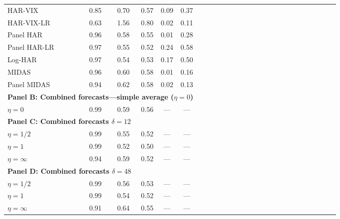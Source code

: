 \begin{tabular}{llccccccccccccccccccccccccc}
\multicolumn{2}{l}{HAR-VIX} & 0.85 & 0.70 & 0.57 & 0.09 & 0.37\\ 
\multicolumn{2}{l}{HAR-VIX-LR} & 0.63 & 1.56 & 0.80 & 0.02 & 0.11\\ 
\multicolumn{2}{l}{Panel HAR} & 0.96 & 0.58 & 0.55 & 0.01 & 0.28\\ 
\multicolumn{2}{l}{Panel HAR-LR} & 0.97 & 0.55 & 0.52 & 0.24 & 0.58\\ 
\midrule 
\multicolumn{2}{l}{Log-HAR} & 0.97 & 0.54 & 0.53 & 0.17 & 0.50\\ 
\midrule 
\multicolumn{2}{l}{MIDAS} & 0.96 & 0.60 & 0.58 & 0.01 & 0.16\\ 
\multicolumn{2}{l}{Panel MIDAS} & 0.94 & 0.62 & 0.58 & 0.02 & 0.13\\ 
\midrule 
\multicolumn{7}{l}{\textbf{Panel B: Combined forecasts---simple average ($\eta = 0$)}} \\ \midrule 
 $\eta = 0$ &  & 0.99 & 0.59 & 0.56 & --- & --- \\ 
\midrule 
\multicolumn{4}{l}{\textbf{Panel C: Combined forecasts $\delta = 12$}} \\ \midrule 
 $\eta = 1/2$  & & 0.99 & 0.55 & 0.52 & --- & --- \\ 
 $\eta = 1$  & & 0.99 & 0.52 & 0.50 & --- & --- \\ 
 $\eta = \infty$ & & 0.94 & 0.59 & 0.52 & --- & --- \\ 
\midrule 
\multicolumn{4}{l}{\textbf{Panel D: Combined forecasts $\delta = 48$}} \\ \midrule 
 $\eta = 1/2$  & & 0.99 & 0.56 & 0.53 & --- & --- \\ 
 $\eta = 1$  & & 0.99 & 0.54 & 0.52 & --- & --- \\ 
 $\eta = \infty$ & & 0.91 & 0.64 & 0.55 & --- & --- \\ 
\bottomrule 
\end{tabular}